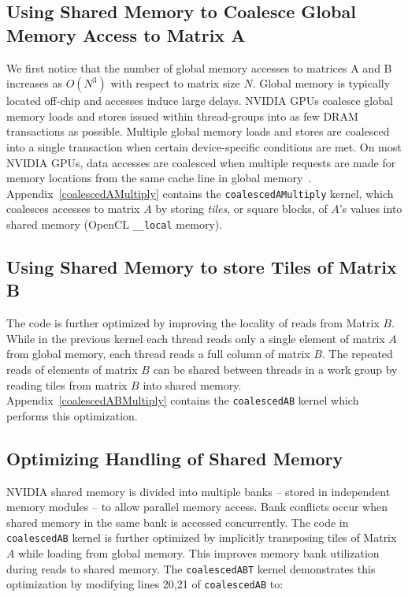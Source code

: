 \documentclass[review=false, sigchi]{acmart}
\begin{document}
	\subsection{Using Shared Memory to Coalesce Global Memory Access to Matrix A} 
	
	We first notice that the number of global memory accesses to matrices A and B increases as $O(N^3)$ with respect to matrix size $N$.
	Global memory is typically located off-chip and accesses induce large delays.
	NVIDIA GPUs coalesce global memory loads and stores issued within thread-groups into as few DRAM transactions as possible.
	Multiple global memory loads and stores are coalesced into a single transaction when certain device-specific conditions are met. 
	On most NVIDIA GPUs, data accesses are coalesced when multiple requests are made for memory locations from the same cache line in global memory~\cite{cudamanual}.
	Appendix~\ref{coalescedAMultiply} contains the \texttt{coalescedAMultiply} kernel, which coalesces accesses to matrix $A$ by storing \emph{tiles}, or square blocks, of $A$'s values into shared memory (OpenCL \texttt{\_\_local} memory). 
	
	
	\subsection{Using Shared Memory to store Tiles of Matrix B} 
	
	The code is further optimized by improving the locality of reads from Matrix $B$.
	While in the previous kernel each thread reads only a single element of matrix $A$ from global memory, each thread reads a full column of matrix $B$.
	The repeated reads of elements of matrix $B$ can be shared between threads in a work group by reading tiles from matrix $B$ into shared memory.
	Appendix~\ref{coalescedABMultiply} contains the \texttt{coalescedAB} kernel which performs this optimization.
	
	\subsection{Optimizing Handling of Shared Memory} 
	
	NVIDIA shared memory is divided into multiple banks -- stored in independent memory modules -- to allow parallel memory access.
	Bank conflicts occur when shared memory in the same bank is accessed concurrently.
	The code in \texttt{coalescedAB} kernel is further optimized by implicitly transposing tiles of Matrix $A$ while loading from global memory. This improves memory bank utilization during reads to shared memory. The \texttt{coalescedABT} kernel demonstrates this optimization by modifying lines 20,21 of \texttt{coalescedAB} to:
	
\end{document}
